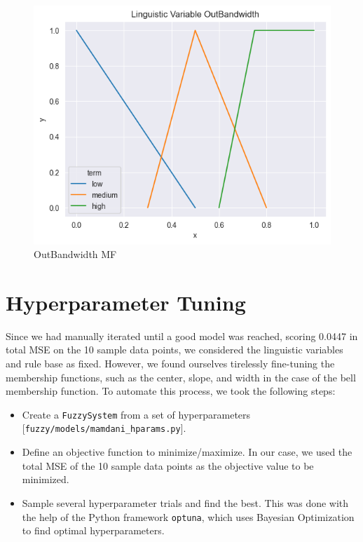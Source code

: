 \documentclass[titlepage]{article}
\begin{document}
\begin{figure}[H]
    \centering
\includegraphics[scale = 0.6]{../images/triangular_v4_OutBandwidth}
\caption{OutBandwidth MF}
\label{fig:bandwidth_triangular_v4}
\end{figure}



\section{Hyperparameter Tuning}
\label{sec:hyper_tuning}

Since we had manually iterated until a good model was reached, scoring 0.0447 in total MSE on the 10 sample data points, we considered the linguistic variables and rule base as fixed.
However, we found ourselves tirelessly fine-tuning the membership functions, such as the center, slope, and width in the case of the bell membership function.
To automate this process, we took the following steps:

\begin{itemize}
    \item Create a \texttt{FuzzySystem} from a set of hyperparameters [\texttt{fuzzy/models/mamdani\_hparams.py}].
    \item Define an objective function to minimize/maximize.
          In our case, we used the total MSE of the 10 sample data points as the objective value to be minimized.
    \item Sample several hyperparameter trials and find the best.
          This was done with the help of the Python framework \texttt{optuna}, which uses Bayesian Optimization to find optimal hyperparameters.
\end{itemize}
\end{document}
